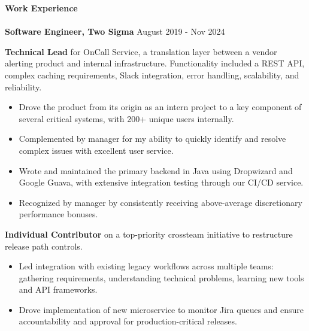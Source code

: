 \documentclass[12pt]{article}
\begin{document}
\begin{flushleft}
    \begin{outline}[compactitem]

        \newlength{\upspacelength}
        \setlength{\upspacelength}{-0.6px}
        \newcommand{\upspace}{\vspace{\upspacelength}}
        \newcommand{\zzz}[1]{\upspace \0 \textbf{#1} \\ \vspace{-0.8\baselineskip} \hrulefill \vspace{-2px} \\ }

        \zzz{Work Experience}
        \vspace{0.25em}
          \1 \textbf{Software Engineer, Two Sigma} \hfill August 2019 - Nov 2024

          \vspace{0.25em}\textbf{Technical Lead} for OnCall Service, a translation layer between a vendor alerting product and internal infrastructure.
          Functionality included a REST API, complex caching requirements, Slack integration, error handling, scalability, and reliability.
          \begin{itemize}
            \item Drove the product from its origin as an intern project to a key component of several critical systems, with 200+ unique users internally.
            \item Complemented by manager for my ability to quickly identify and resolve complex issues with excellent user service.
            \item Wrote and maintained the primary backend in Java using Dropwizard and Google Guava, with extensive integration testing through our CI/CD service.
            \item Recognized by manager by consistently receiving above-average discretionary performance bonuses.
          \end{itemize}

          \vspace{0.25em}\textbf{Individual Contributor} on a top-priority crossteam initiative to restructure release path controls.
          \begin{itemize}
            \item Led integration with existing legacy workflows across multiple teams: gathering requirements, understanding technical problems, learning new tools and API frameworks.
            \item Drove implementation of new microservice to monitor Jira queues and ensure accountability and approval for production-critical releases.
          \end{itemize}


\end{outline}
\end{flushleft}
\end{document}
